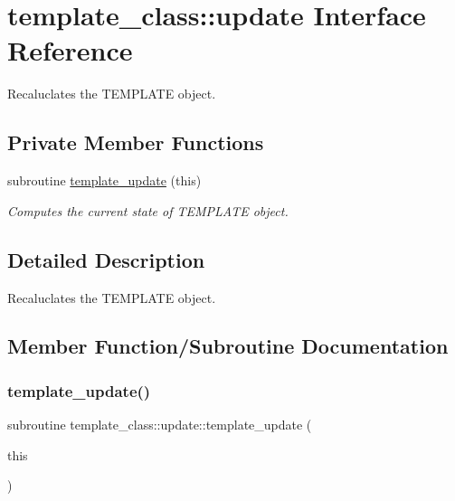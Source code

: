 \hypertarget{interfacetemplate__class_1_1update}{}\section{template\+\_\+class\+:\+:update Interface Reference}
\label{interfacetemplate__class_1_1update}


Recaluclates the T\+E\+M\+P\+L\+A\+TE object.  


\subsection*{Private Member Functions}
\begin{DoxyCompactItemize}
\item 
subroutine \hyperlink{interfacetemplate__class_1_1update_a1cd6638855ff72f50738f66b537e5a1b}{template\+\_\+update} (this)
\begin{DoxyCompactList}\small\item\em Computes the current state of T\+E\+M\+P\+L\+A\+TE object. \end{DoxyCompactList}\end{DoxyCompactItemize}


\subsection{Detailed Description}
Recaluclates the T\+E\+M\+P\+L\+A\+TE object. 

\subsection{Member Function/\+Subroutine Documentation}
\mbox{\label{interfacetemplate__class_1_1update_a1cd6638855ff72f50738f66b537e5a1b}} 
\subsubsection{\texorpdfstring{template\+\_\+update()}{template\_update()}}
{\footnotesize\ttfamily subroutine template\+\_\+class\+::update\+::template\+\_\+update (\begin{DoxyParamCaption}\item[{type(\hyperlink{structtemplate__class_1_1template}{template}), intent(inout)}]{this }\end{DoxyParamCaption})\hspace{0.3cm}{\ttfamily [private]}}



